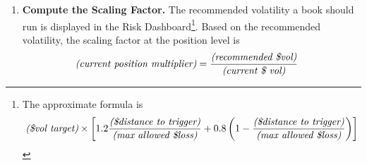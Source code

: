 \documentclass[11pt]{gappyarticle}
\begin{document}
\begin{enumerate}
	\item \textbf{Compute the Scaling Factor.}
	The recommended volatility a book should run is displayed in the Risk Dashboard\footnote{The approximate formula is
	\begin{align*}
		 \emph{(\$vol target)} \times \left[ 1.2  \frac{\emph{(\$distance to trigger)} }{\emph{(max allowed \$loss)}} + 0.8 \left(1-  \frac{\emph{(\$distance to trigger)} }{\emph{(max allowed \$loss)}} \right) \right]
	\end{align*}
	}. Based on the recommended volatility, the scaling factor at the position level is
	\begin{align*}
	\text{\emph{(current position multiplier)}} 
 & = \frac{\text{\emph{(recommended \$vol)}}}
{\text{\emph{(current \$ vol)}}}
\end{align*}


\end{enumerate}
\end{document}
